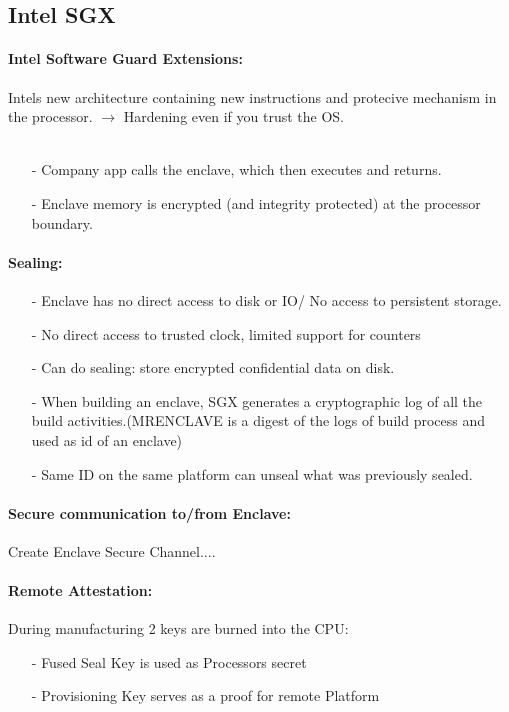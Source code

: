 \subsection{Intel SGX}
\paragraph{Intel Software Guard Extensions: }Intels new architecture containing new instructions and protecive mechanism in the processor.
$\rightarrow$ Hardening even if you trust the OS.\\
\\
\begin{itemize}
    \item[-]Company app calls the enclave, which then executes and returns.
    \item[-]Enclave memory is encrypted (and integrity protected) at the processor boundary.
\end{itemize}

\paragraph{Sealing: }
\begin{itemize}
    \item[-]Enclave has no direct access to disk or IO/ No access to persistent storage.
    \item[-]No direct access to trusted clock, limited support for counters
    \item[-]Can do sealing: store encrypted confidential data on disk.
    \item[-]When building an enclave, SGX generates a cryptographic log of all the build activities.(MRENCLAVE is a digest of the logs of build process and used as id of an enclave)
    \item[-]Same ID on the same platform can unseal what was previously sealed.
\end{itemize}

\paragraph{Secure communication to/from Enclave:}
Create Enclave Secure Channel....

\paragraph{Remote Attestation: }
During manufacturing 2 keys are burned into the CPU: 
\begin{itemize}
    \item[-]Fused Seal Key is used as Processors secret
    \item[-]Provisioning Key serves as a proof for remote Platform
\end{itemize}

